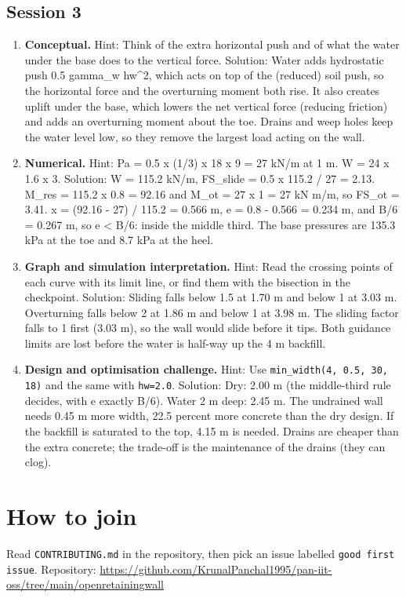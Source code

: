 \documentclass[11pt,a4paper]{article}
\begin{document}
\subsection*{Session 3}
\begin{enumerate}[nosep]
\item \textbf{Conceptual.} Hint: Think of the extra horizontal push and of what the water under the base does to the vertical force. Solution: Water adds hydrostatic push 0.5 gamma\_w hw\textasciicircum{}2, which acts on top of the (reduced) soil push, so the horizontal force and the overturning moment both rise. It also creates uplift under the base, which lowers the net vertical force (reducing friction) and adds an overturning moment about the toe. Drains and weep holes keep the water level low, so they remove the largest load acting on the wall.
\item \textbf{Numerical.} Hint: Pa = 0.5 x (1/3) x 18 x 9 = 27 kN/m at 1 m. W = 24 x 1.6 x 3. Solution: W = 115.2 kN/m, FS\_slide = 0.5 x 115.2 / 27 = 2.13. M\_res = 115.2 x 0.8 = 92.16 and M\_ot = 27 x 1 = 27 kN m/m, so FS\_ot = 3.41. x = (92.16 - 27) / 115.2 = 0.566 m, e = 0.8 - 0.566 = 0.234 m, and B/6 = 0.267 m, so e \textless{} B/6: inside the middle third. The base pressures are 135.3 kPa at the toe and 8.7 kPa at the heel.
\item \textbf{Graph and simulation interpretation.} Hint: Read the crossing points of each curve with its limit line, or find them with the bisection in the checkpoint. Solution: Sliding falls below 1.5 at 1.70 m and below 1 at 3.03 m. Overturning falls below 2 at 1.86 m and below 1 at 3.98 m. The sliding factor falls to 1 first (3.03 m), so the wall would slide before it tips. Both guidance limits are lost before the water is half-way up the 4 m backfill.
\item \textbf{Design and optimisation challenge.} Hint: Use \texttt{min\_width(4, 0.5, 30, 18)} and the same with \texttt{hw=2.0}. Solution: Dry: 2.00 m (the middle-third rule decides, with e exactly B/6). Water 2 m deep: 2.45 m. The undrained wall needs 0.45 m more width, 22.5 percent more concrete than the dry design. If the backfill is saturated to the top, 4.15 m is needed. Drains are cheaper than the extra concrete; the trade-off is the maintenance of the drains (they can clog).
\end{enumerate}

\section{How to join}
Read \texttt{CONTRIBUTING.md} in the repository, then pick an issue labelled \texttt{good first issue}. Repository: \url{https://github.com/KrunalPanchal1995/pan-iit-oss/tree/main/openretainingwall}
\end{document}
